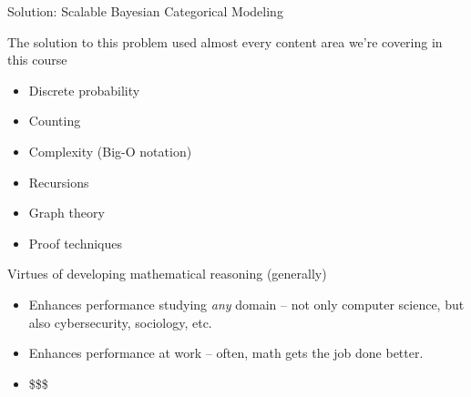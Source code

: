 \documentclass[10pt]{beamer}
\begin{document}
\begin{frame}{Solution: Scalable Bayesian Categorical Modeling}
{}%
{}%
%
\end{frame}



\begin{frame}[standout]

\large \centering
The solution to this problem used almost every content area we're covering in this course

\vfill 
\begin{itemize}
	\item Discrete probability 
	\item Counting
	\item Complexity (Big-O notation)
	\item Recursions
	\item Graph theory
	\item Proof techniques
\end{itemize}
\end{frame}



\begin{frame}{Virtues of developing mathematical reasoning (generally)}

\begin{itemize}
\item Enhances performance studying \textit{any} domain -- not only computer science, but also cybersecurity, sociology, etc.  \pause 
\item Enhances performance at work -- often, math gets the job done better. \pause 
\item \$\$\$ \pause 
\end{itemize}

\end{frame}
\end{document}
